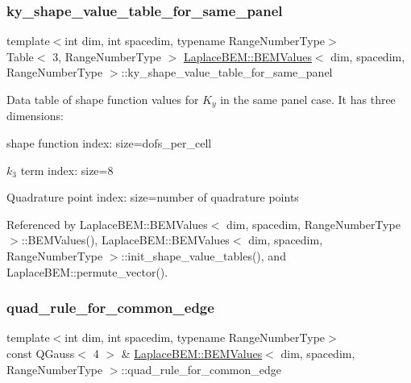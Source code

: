 \subsubsection{\texorpdfstring{ky\+\_\+shape\+\_\+value\+\_\+table\+\_\+for\+\_\+same\+\_\+panel}{ky\_shape\_value\_table\_for\_same\_panel}}
{\footnotesize\ttfamily template$<$int dim, int spacedim, typename Range\+Number\+Type$>$ \\
Table$<$ 3, Range\+Number\+Type $>$ \hyperlink{classLaplaceBEM_1_1BEMValues}{Laplace\+B\+E\+M\+::\+B\+E\+M\+Values}$<$ dim, spacedim, Range\+Number\+Type $>$\+::ky\+\_\+shape\+\_\+value\+\_\+table\+\_\+for\+\_\+same\+\_\+panel}

Data table of shape function values for $K_y$ in the same panel case. It has three dimensions\+:
\begin{DoxyEnumerate}
\item shape function index\+: size={\ttfamily dofs\+\_\+per\+\_\+cell} 
\item $k_3$ term index\+: size=8
\item Quadrature point index\+: size=number of quadrature points 
\end{DoxyEnumerate}

Referenced by Laplace\+B\+E\+M\+::\+B\+E\+M\+Values$<$ dim, spacedim, Range\+Number\+Type $>$\+::\+B\+E\+M\+Values(), Laplace\+B\+E\+M\+::\+B\+E\+M\+Values$<$ dim, spacedim, Range\+Number\+Type $>$\+::init\+\_\+shape\+\_\+value\+\_\+tables(), and Laplace\+B\+E\+M\+::permute\+\_\+vector().

\mbox{\label{classLaplaceBEM_1_1BEMValues_ac1cdb156deba4802692ca916d40bacda}} 
\subsubsection{\texorpdfstring{quad\+\_\+rule\+\_\+for\+\_\+common\+\_\+edge}{quad\_rule\_for\_common\_edge}}
{\footnotesize\ttfamily template$<$int dim, int spacedim, typename Range\+Number\+Type$>$ \\
const Q\+Gauss$<$ 4 $>$ \& \hyperlink{classLaplaceBEM_1_1BEMValues}{Laplace\+B\+E\+M\+::\+B\+E\+M\+Values}$<$ dim, spacedim, Range\+Number\+Type $>$\+::quad\+\_\+rule\+\_\+for\+\_\+common\+\_\+edge}

